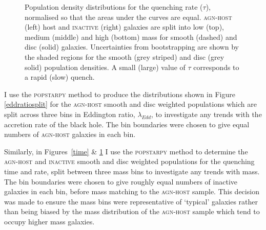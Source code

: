 \begin{figure}
\caption[Quenching rate population density distributions for the \textsc{agn-host} and \textsc{inactive} samples]{Population density distributions for the quenching rate ($\tau$), normalised so that the areas under the curves are equal. \textsc{agn-host} (left) host and \textsc{inactive} (right) galaxies are split into low (top), medium (middle) and high (bottom) mass for smooth (dashed) and disc (solid) galaxies. Uncertainties from bootstrapping are shown by the shaded regions for the smooth (grey striped) and disc (grey solid) population densities. A small (large) value of $\tau$ corresponds to a rapid (slow) quench.}
\label{rate}
\end{figure}



I use the \textsc{popstarpy} method to produce the distributions shown in Figure \ref{eddratiosplit} for the \textsc{agn-host} smooth and disc weighted populations which are split across three bins in Eddington ratio, $\lambda_{Edd}$, to investigate any trends with the accretion rate of the black hole. The bin boundaries were chosen to give equal numbers of \textsc{agn-host} galaxies in each bin. 

Similarly, in Figures~\ref{time} \& \ref{rate} I use the \textsc{popstarpy} method to determine the \textsc{agn-host} and \textsc{inactive} smooth and disc weighted populations for the quenching time and rate, split between three mass bins to investigate any trends with mass. The bin boundaries were chosen to give roughly equal numbers of inactive galaxies in each bin, before mass matching to the \textsc{agn-host} sample. This decision was made to ensure the mass bins were representative of `typical' galaxies rather than being biased by the mass distribution of the \textsc{agn-host} sample which tend to occupy higher mass galaxies. 

